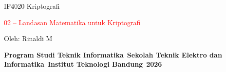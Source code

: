\documentclass{article}
\begin{document}

\begin{center}
{\large IF4020 Kriptografi}

\vspace{20mm}
{\huge \textcolor{red}{02 -- Landasan Matematika untuk Kriptografi}}

\vspace{15mm}
Oleh: Rinaldi M

\vspace{10mm}
\textbf{Program Studi Teknik Informatika}\
\textbf{Sekolah Teknik Elektro dan Informatika}\
\textbf{Institut Teknologi Bandung}\
\textbf{2026}
\end{center}
\end{document}
